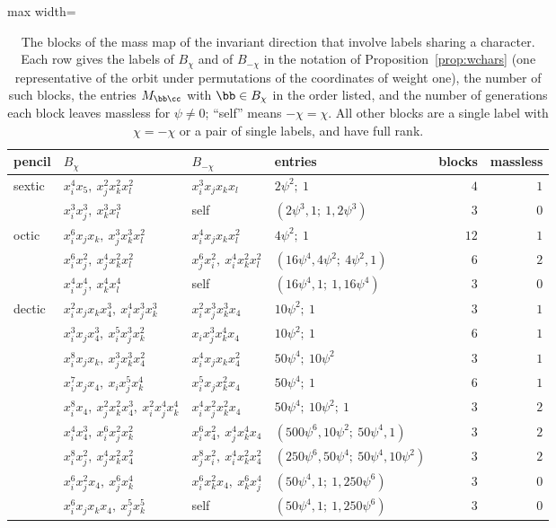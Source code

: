 \begin{table}[t]
\caption{The blocks of the mass map of the invariant direction that
involve labels sharing a character. Each row gives the labels of
$B_\chi$ and of $B_{-\chi}$ in the notation of
Proposition~\ref{prop:wchars} (one representative of the orbit under
permutations of the coordinates of weight one), the number of such blocks,
the entries $M_{\bb\cc}$ with $\bb\in B_\chi$ in the order listed, and the
number of generations each block leaves massless for $\psi\ne0$; ``self''
means $-\chi=\chi$. All other blocks are a single label with $\chi=-\chi$
or a pair of single labels, and have full rank.}
\label{tab:wblocks}
\centering
\begin{adjustbox}{max width=\linewidth}\begin{tabular}{llllrr}
\toprule
pencil & $B_\chi$ & $B_{-\chi}$ & entries & blocks & massless\\
\midrule
sextic & $x_i^4x_5,\ x_j^2x_k^2x_l^2$ & $x_i^3x_jx_kx_l$ &
$2\psi^2;\ 1$ & $4$ & $1$\\
 & $x_i^3x_j^3,\ x_k^3x_l^3$ & self & $(2\psi^3,1;\ 1,2\psi^3)$ & $3$ & $0$\\
\midrule
octic & $x_i^6x_jx_k,\ x_j^3x_k^3x_l^2$ & $x_i^4x_jx_kx_l^2$ &
$4\psi^2;\ 1$ & $12$ & $1$\\
 & $x_i^6x_j^2,\ x_j^4x_k^2x_l^2$ & $x_j^6x_i^2,\ x_i^4x_k^2x_l^2$ &
$(16\psi^4,4\psi^2;\ 4\psi^2,1)$ & $6$ & $2$\\
 & $x_i^4x_j^4,\ x_k^4x_l^4$ & self & $(16\psi^4,1;\ 1,16\psi^4)$ & $3$ & $0$\\
\midrule
dectic & $x_i^2x_jx_kx_4^3,\ x_i^4x_j^3x_k^3$ & $x_i^2x_j^3x_k^3x_4$ &
$10\psi^2;\ 1$ & $3$ & $1$\\
 & $x_i^3x_jx_4^3,\ x_i^5x_j^3x_k^2$ & $x_ix_j^3x_k^4x_4$ &
$10\psi^2;\ 1$ & $6$ & $1$\\
 & $x_i^8x_jx_k,\ x_j^3x_k^3x_4^2$ & $x_i^4x_jx_kx_4^2$ &
$50\psi^4;\ 10\psi^2$ & $3$ & $1$\\
 & $x_i^7x_jx_4,\ x_ix_j^5x_k^4$ & $x_i^5x_jx_k^2x_4$ &
$50\psi^4;\ 1$ & $6$ & $1$\\
 & $x_i^8x_4,\ x_j^2x_k^2x_4^3,\ x_i^2x_j^4x_k^4$ & $x_i^4x_j^2x_k^2x_4$ &
$50\psi^4;\ 10\psi^2;\ 1$ & $3$ & $2$\\
 & $x_i^4x_4^3,\ x_i^6x_j^2x_k^2$ & $x_i^6x_4^2,\ x_j^4x_k^4x_4$ &
$(500\psi^6,10\psi^2;\ 50\psi^4,1)$ & $3$ & $2$\\
 & $x_i^8x_j^2,\ x_j^4x_k^2x_4^2$ & $x_j^8x_i^2,\ x_i^4x_k^2x_4^2$ &
$(250\psi^6,50\psi^4;\ 50\psi^4,10\psi^2)$ & $3$ & $2$\\
 & $x_i^6x_j^2x_4,\ x_j^6x_k^4$ & $x_i^6x_k^2x_4,\ x_k^6x_j^4$ &
$(50\psi^4,1;\ 1,250\psi^6)$ & $3$ & $0$\\
 & $x_i^6x_jx_kx_4,\ x_j^5x_k^5$ & self & $(50\psi^4,1;\ 1,250\psi^6)$ & $3$ & $0$\\
\bottomrule
\end{tabular}\end{adjustbox}
\end{table}

